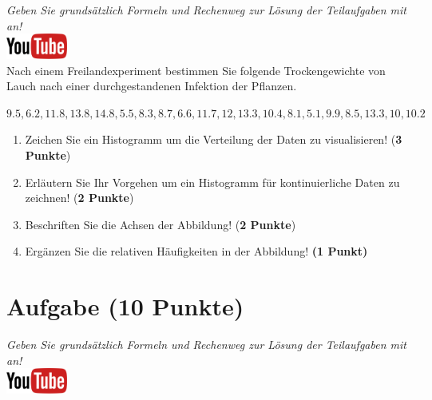 \documentclass[a4paper, 9pt]{scrartcl}\usepackage[]{graphicx}\usepackage[]{xcolor}
\begin{document}
\textit{Geben Sie grunds{\"a}tzlich Formeln und Rechenweg zur L{\"o}sung der
  Teilaufgaben mit an!} \\[1Ex]

\hfill\href{https://youtu.be/ORHSPTCdfeY}{\includegraphics[width =
  2cm]{img/youtube}}\\[1Ex]



Nach einem Freilandexperiment bestimmen Sie folgende Trockengewichte von
Lauch nach einer durchgestandenen Infektion der Pflanzen. 

\begin{center}
$9.5, 6.2, 11.8, 13.8, 14.8, 5.5, 8.3, 8.7, 6.6, 11.7, 12, 13.3, 10.4, 8.1, 5.1, 9.9, 8.5, 13.3, 10, 10.2$
\end{center}

\begin{enumerate}
\item Zeichen Sie ein Histogramm um die Verteilung der Daten zu
  visualisieren! (\textbf{3 Punkte})
 \item Erl{\"a}utern Sie Ihr Vorgehen um ein Histogramm f{\"u}r kontinuierliche
  Daten zu zeichnen!  (\textbf{2 Punkte})
\item Beschriften Sie die Achsen der Abbildung! (\textbf{2 Punkte})
\item Erg{\"a}nzen Sie die relativen H{\"a}ufigkeiten in der Abbildung! \textbf{(1
    Punkt)}  
\end{enumerate}

 
\clearpage

\section{Aufgabe \hfill (10 Punkte)}

\textit{Geben Sie grunds{\"a}tzlich Formeln und Rechenweg zur L{\"o}sung der
  Teilaufgaben mit an!} \\[1Ex]

\hfill\href{https://youtu.be/VAqiUdV4WQ0}{\includegraphics[width =
  2cm]{img/youtube}}\\[1Ex]
\end{document}
